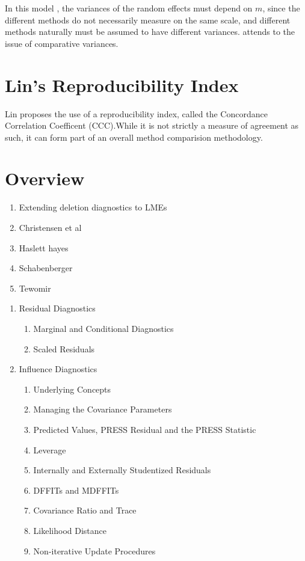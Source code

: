 \documentclass[12pt, a4paper]{report}
\theoremstyle{plain}
\theoremstyle{definition}
\theoremstyle{remark}
\begin{document}
	
	
	In this model , the variances of the random effects must depend on
	$m$, since the different methods do not necessarily measure on the
	same scale, and different methods naturally must be assumed to
	have different variances. \citet{BXC2004} attends to the issue of
	comparative variances.
	\section{Lin's Reproducibility Index} Lin proposes the use of a
	reproducibility index, called the Concordance Correlation
	Coefficent (CCC).While it is not strictly a measure of agreement
	as such, it can form part of an overall method comparision
	methodology.
	
	\section{Overview}
	\begin{enumerate}
		\item Extending deletion diagnostics to LMEs
		\item Christensen et al
		\item Haslett hayes
		\item Schabenberger
		\item Tewomir
	\end{enumerate}
	
	\begin{enumerate}
		\item Residual Diagnostics
		\begin{enumerate}
			\item Marginal and Conditional Diagnostics
			\item Scaled Residuals
		\end{enumerate}
		
		\item Influence Diagnostics
		\begin{enumerate}
			\item Underlying Concepts
			\item Managing the Covariance Parameters
			\item Predicted Values, PRESS Residual and the PRESS Statistic
			\item Leverage
			\item Internally and Externally Studentized Residuals
			\item DFFITs and MDFFITs
			\item Covariance Ratio and Trace
			\item Likelihood Distance
			\item Non-iterative Update Procedures
		\end{enumerate}
	\end{enumerate}
	
\end{document}
